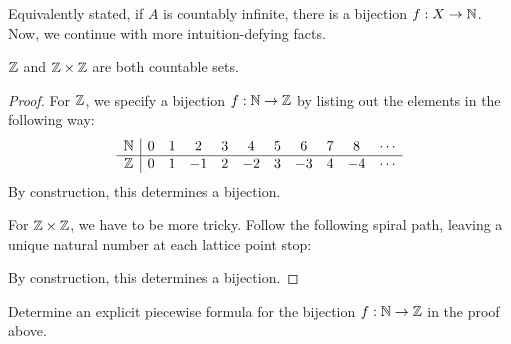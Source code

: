 \documentclass{article}
\begin{document}
Equivalently stated, if $A$ is countably infinite, there is a bijection $f: X\to \mathbb N$. Now, we continue with more intuition-defying facts.
\begin{proposition}
$\mathbb Z$ and $\mathbb Z\times \mathbb Z$ are both countable sets.
\end{proposition}
\begin{proof}
For $\mathbb Z$, we specify a bijection $f: \mathbb N \to \mathbb Z$ by listing out the elements in the following way:
$$\begin{array}{c|cccccccccccccc}
\mathbb N & 0 & 1 & 2 & 3 & 4 & 5 & 6 & 7 & 8 & \cdots \\\hline
\mathbb Z & 0 & 1 & -1 & 2 & -2 & 3 & -3 & 4 & -4 & \cdots  
\end{array}$$
By construction, this determines a bijection.

For $\mathbb Z\times \mathbb Z$, we have to be more tricky. Follow the following spiral path, leaving a unique natural number at each lattice point stop:
\begin{center}
\end{center}
By construction, this determines a bijection.
\end{proof}
\begin{exercise}
Determine an explicit piecewise formula for the bijection $f: \mathbb N \to \mathbb Z$ in the proof above.
\end{exercise}
\end{document}
